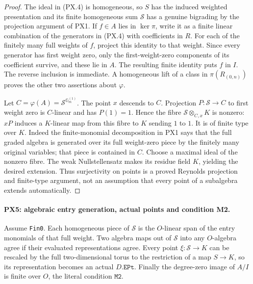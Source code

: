 \begin{proof}
The ideal in (PX.4) is homogeneous, so $S$ has the
induced weighted presentation and its finite homogeneous
sum $\mathcal S$ has a genuine bigrading by the projection
argument of PX1.  If $f\in A$ lies in $\ker\pi$, write
it as a finite linear combination of the generators in
(PX.4) with coefficients in $R$.  For each of the
finitely many full weights of $f$, project this identity
to that weight.  Since every generator has first weight
zero, only the first-weight-zero components of its
coefficient survive, and these lie in $A$.  The resulting
finite identity puts $f$ in $I$.  The reverse inclusion
is immediate.  A homogeneous lift of a class in
$\pi(R_{(0,n)})$ proves the other two assertions about
$\varphi$.

Let $C=\varphi(A)=\mathcal S^{\mathbb G_m^{(1)}}$.
The point $x$ descends to $C$.  Projection
$P:\mathcal S\to C$ to first weight zero is $C$-linear
and has $P(1)=1$.  Hence the fibre
$\mathcal S\otimes_{C,x}K$ is nonzero: $xP$ induces
a $K$-linear map from this fibre to $K$ sending $1$ to
$1$.  It is of finite type over $K$.  Indeed the
finite-monomial decomposition in PX1 says that the full
graded algebra is generated over its full weight-zero
piece by the finitely many original variables; that
piece is contained in $C$.  Choose a maximal ideal of
the nonzero fibre.  The weak Nullstellensatz makes its
residue field $K$, yielding the desired extension.
Thus surjectivity on points is a proved Reynolds
projection and finite-type argument, not an assumption
that every point of a subalgebra extends automatically.
\end{proof}

\paragraph{PX5: algebraic entry generation, actual points and condition M2.}
\label{claim:PX5}
Assume \texttt{Fin0}.  Each homogeneous piece of
$\mathcal S$ is the $O$-linear span of the entry
monomials of that full weight.  Two algebra maps out
of $\mathcal S$ into any $O$-algebra agree if their
evaluated representations agree.  Every point
$\xi:\mathcal S\to K$ can be rescaled by the full
two-dimensional torus to the restriction of a map
$S\to K$, so its representation becomes an actual
$D.\mathtt{EPt}$.  Finally the degree-zero image of
$A/I$ is finite over $O$, the literal condition
$\mathtt{M2}$.

